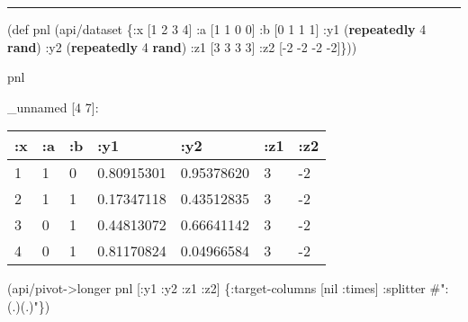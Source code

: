 \documentclass[]{article}
\newenvironment{Shaded}{\begin{snugshade}}{\end{snugshade}}
\newcommand{\AttributeTok}[1]{\textcolor[rgb]{0.77,0.63,0.00}{#1}}
\newcommand{\BuiltInTok}[1]{#1}
\newcommand{\DecValTok}[1]{\textcolor[rgb]{0.00,0.00,0.81}{#1}}
\newcommand{\FunctionTok}[1]{\textcolor[rgb]{0.00,0.00,0.00}{#1}}
\newcommand{\KeywordTok}[1]{\textcolor[rgb]{0.13,0.29,0.53}{\textbf{#1}}}
\newcommand{\NormalTok}[1]{#1}
\newcommand{\SpecialStringTok}[1]{\textcolor[rgb]{0.31,0.60,0.02}{#1}}
\newcommand{\VariableTok}[1]{\textcolor[rgb]{0.00,0.00,0.00}{#1}}
\begin{document}
\begin{center}\rule{0.5\linewidth}{0.5pt}\end{center}

\begin{Shaded}
\begin{Highlighting}[]
\NormalTok{(}\BuiltInTok{def}\FunctionTok{ pnl }\NormalTok{(api/dataset \{}\AttributeTok{:x}\NormalTok{ [}\DecValTok{1} \DecValTok{2} \DecValTok{3} \DecValTok{4}\NormalTok{]}
                       \AttributeTok{:a}\NormalTok{ [}\DecValTok{1} \DecValTok{1} \DecValTok{0} \DecValTok{0}\NormalTok{]}
                       \AttributeTok{:b}\NormalTok{ [}\DecValTok{0} \DecValTok{1} \DecValTok{1} \DecValTok{1}\NormalTok{]}
                       \AttributeTok{:y1}\NormalTok{ (}\KeywordTok{repeatedly} \DecValTok{4} \KeywordTok{rand}\NormalTok{)}
                       \AttributeTok{:y2}\NormalTok{ (}\KeywordTok{repeatedly} \DecValTok{4} \KeywordTok{rand}\NormalTok{)}
                       \AttributeTok{:z1}\NormalTok{ [}\DecValTok{3} \DecValTok{3} \DecValTok{3} \DecValTok{3}\NormalTok{]}
                       \AttributeTok{:z2}\NormalTok{ [-}\DecValTok{2} \DecValTok{-2} \DecValTok{-2} \DecValTok{-2}\NormalTok{]\}))}
\end{Highlighting}
\end{Shaded}

\begin{Shaded}
\begin{Highlighting}[]
\NormalTok{pnl}
\end{Highlighting}
\end{Shaded}

\_unnamed {[}4 7{]}:

\begin{longtable}[]{@{}lllllll@{}}
\toprule
:x & :a & :b & :y1 & :y2 & :z1 & :z2\tabularnewline
\midrule
\endhead
1 & 1 & 0 & 0.80915301 & 0.95378620 & 3 & -2\tabularnewline
2 & 1 & 1 & 0.17347118 & 0.43512835 & 3 & -2\tabularnewline
3 & 0 & 1 & 0.44813072 & 0.66641142 & 3 & -2\tabularnewline
4 & 0 & 1 & 0.81170824 & 0.04966584 & 3 & -2\tabularnewline
\bottomrule
\end{longtable}

\begin{Shaded}
\begin{Highlighting}[]
\NormalTok{(api/pivot->longer pnl [}\AttributeTok{:y1} \AttributeTok{:y2} \AttributeTok{:z1} \AttributeTok{:z2}\NormalTok{] \{}\AttributeTok{:target-columns}\NormalTok{ [}\VariableTok{nil} \AttributeTok{:times}\NormalTok{]}
                                          \AttributeTok{:splitter} \SpecialStringTok{#":(.)(.)"}\NormalTok{\})}
\end{Highlighting}
\end{Shaded}
\end{document}
